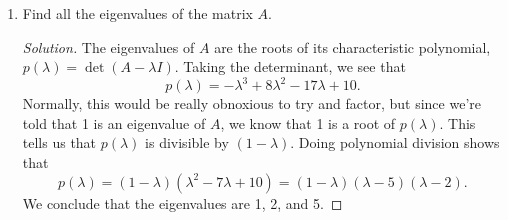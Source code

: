 \documentclass[11pt,letterpaper]{report}
\newenvironment{solution}
{\begin{proof}[Solution]}
{\end{proof}}
\begin{document}
\begin{enumerate}
\begin{enumerate}
		\item Find all the eigenvalues of the matrix $A$.
		\begin{solution}
			The eigenvalues of $A$ are the roots of its characteristic polynomial, $p(\lambda) = \det(A-\lambda I)$. Taking the determinant, we see that
			\[
				p(\lambda) = -\lambda^3+8\lambda^2-17\lambda+10.
			\]
			Normally, this would be really obnoxious to try and factor, but since we're told that 1 is an eigenvalue of $A$, we know that 1 is a root of $p(\lambda)$. This tells us that $p(\lambda)$ is divisible by $(1-\lambda)$. Doing polynomial division shows that
			\[
			p(\lambda) = (1-\lambda)(\lambda^2-7\lambda+10) = (1-\lambda)(\lambda-5)(\lambda-2).
			\]
			We conclude that the eigenvalues are 1, 2, and 5.
		\end{solution}
	\end{enumerate}
\end{enumerate}
\end{document}
